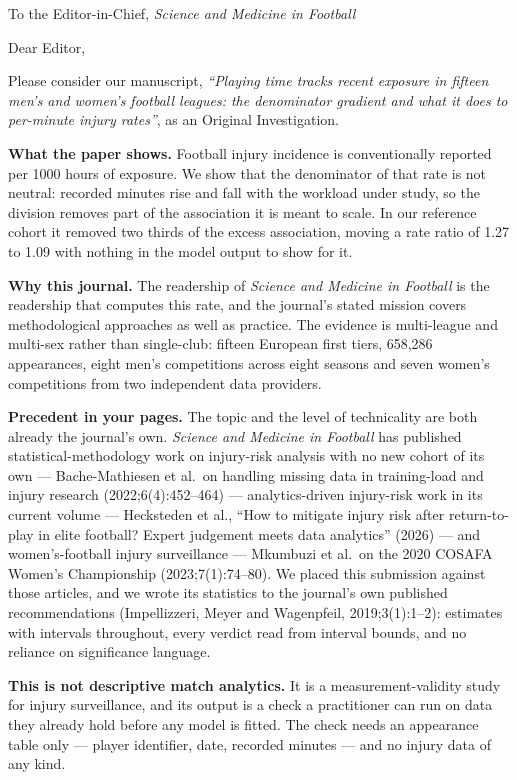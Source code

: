 \documentclass[11pt]{article}
\begin{document}
To the Editor-in-Chief, \emph{Science and Medicine in Football}

Dear Editor,

Please consider our manuscript, \emph{``Playing time tracks recent exposure in
fifteen men's and women's football leagues: the denominator gradient and what
it does to per-minute injury rates''}, as an Original Investigation.

\textbf{What the paper shows.} Football injury incidence is conventionally
reported per 1000 hours of exposure. We show that the denominator of that rate
is not neutral: recorded minutes rise and fall with the workload under study,
so the division removes part of the association it is meant to scale. In our
reference cohort it removed two thirds of the excess association, moving a rate
ratio of 1.27 to 1.09 with nothing in the model output to show for it.

\textbf{Why this journal.} The readership of \emph{Science and Medicine in
Football} is the readership that computes this rate, and the journal's stated
mission covers methodological approaches as well as practice. The evidence is
multi-league and multi-sex rather than single-club: fifteen European first
tiers, 658,286 appearances, eight men's competitions across eight seasons and
seven women's competitions from two independent data providers.

\textbf{Precedent in your pages.} The topic and the level of technicality are
both already the journal's own. \emph{Science and Medicine in Football} has
published statistical-methodology work on injury-risk analysis with no new
cohort of its own --- Bache-Mathiesen et al.\ on handling missing data in
training-load and injury research (2022;6(4):452--464) --- analytics-driven
injury-risk work in its current volume --- Hecksteden et al., ``How to mitigate
injury risk after return-to-play in elite football? Expert judgement meets data
analytics'' (2026) --- and women's-football injury surveillance --- Mkumbuzi et
al.\ on the 2020 COSAFA Women's Championship (2023;7(1):74--80). We placed this
submission against those articles, and we wrote its statistics to the journal's
own published recommendations (Impellizzeri, Meyer and Wagenpfeil,
2019;3(1):1--2): estimates with intervals throughout, every verdict read from
interval bounds, and no reliance on significance language.

\textbf{This is not descriptive match analytics.} It is a measurement-validity
study for injury surveillance, and its output is a check a practitioner can run
on data they already hold before any model is fitted. The check needs an
appearance table only --- player identifier, date, recorded minutes --- and no
injury data of any kind.
\end{document}
